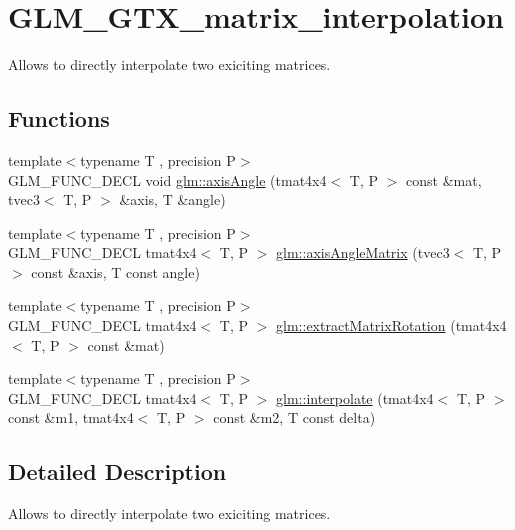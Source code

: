 \hypertarget{group__gtx__matrix__interpolation}{}\section{G\+L\+M\+\_\+\+G\+T\+X\+\_\+matrix\+\_\+interpolation}
\label{group__gtx__matrix__interpolation}


Allows to directly interpolate two exiciting matrices.  


\subsection*{Functions}
\begin{DoxyCompactItemize}
\item 
{\footnotesize template$<$typename T , precision P$>$ }\\G\+L\+M\+\_\+\+F\+U\+N\+C\+\_\+\+D\+E\+C\+L void \hyperlink{group__gtx__matrix__interpolation_ga9aef292eb5f29bdbb58a53ef4281af92}{glm\+::axis\+Angle} (tmat4x4$<$ T, P $>$ const \&mat, tvec3$<$ T, P $>$ \&axis, T \&angle)
\item 
{\footnotesize template$<$typename T , precision P$>$ }\\G\+L\+M\+\_\+\+F\+U\+N\+C\+\_\+\+D\+E\+C\+L tmat4x4$<$ T, P $>$ \hyperlink{group__gtx__matrix__interpolation_ga82d4bc058e9628cb2ea1d4e117a0cf39}{glm\+::axis\+Angle\+Matrix} (tvec3$<$ T, P $>$ const \&axis, T const angle)
\item 
{\footnotesize template$<$typename T , precision P$>$ }\\G\+L\+M\+\_\+\+F\+U\+N\+C\+\_\+\+D\+E\+C\+L tmat4x4$<$ T, P $>$ \hyperlink{group__gtx__matrix__interpolation_ga6b8170aa4cf43caf81400696ebb38afe}{glm\+::extract\+Matrix\+Rotation} (tmat4x4$<$ T, P $>$ const \&mat)
\item 
{\footnotesize template$<$typename T , precision P$>$ }\\G\+L\+M\+\_\+\+F\+U\+N\+C\+\_\+\+D\+E\+C\+L tmat4x4$<$ T, P $>$ \hyperlink{group__gtx__matrix__interpolation_ga45099a92c5c704503565619ac2bcd5c6}{glm\+::interpolate} (tmat4x4$<$ T, P $>$ const \&m1, tmat4x4$<$ T, P $>$ const \&m2, T const delta)
\end{DoxyCompactItemize}


\subsection{Detailed Description}
Allows to directly interpolate two exiciting matrices. 

